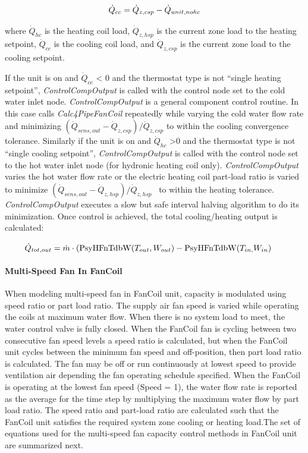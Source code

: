\begin{equation}
{\dot Q_{cc}} = {\dot Q_{z,csp}} - {\dot Q_{unit,no{\rm{ }}hc}}
\end{equation}

where \({\dot Q_{hc}}\) is the heating coil load, \({\dot Q_{z,hsp}}\) is the current zone load to the heating setpoint, \({\dot Q_{cc}}\) is the cooling coil load, and \({\dot Q_{z,csp}}\) is the current zone load to the cooling setpoint.

If the unit is on and \({\dot Q_{cc}}\) \textless{} 0 and the thermostat type is not ``single heating setpoint'', \emph{ControlCompOutput} is called with the control node set to the cold water inlet node. \emph{ControlCompOutput} is a general component control routine. In this case calls \emph{Calc4PipeFanCoil} repeatedly while varying the cold water flow rate and minimizing \(({\dot Q_{sens,out}} - {\dot Q_{z,csp}})/{\dot Q_{z,csp}}\) to within the cooling convergence tolerance. Similarly if the unit is on and \({\dot Q_{hc}}\) \textgreater{}0 and the thermostat type is not ``single cooling setpoint'', \emph{ControlCompOutput} is called with the control node set to the hot water inlet node (for hydronic heating coil only). \emph{ControlCompOutput} varies the hot water flow rate or the electric heating coil part-load ratio is varied to minimize \(({\dot Q_{sens,out}} - {\dot Q_{z,hsp}})/{\dot Q_{z,hsp}}\) ~to within the heating tolerance. \emph{ControlCompOutput} executes a slow but safe interval halving algorithm to do its minimization. Once control is achieved, the total cooling/heating output is calculated:

~~~~ \({\dot Q_{tot,out}} = \dot m\cdot ({\mathop{\rm PsyHFnTdbW}\nolimits} ({T_{out}},{W_{out}}) - {\mathop{\rm PsyHFnTdbW}\nolimits} ({T_{in,}}{W_{in}})\)

\paragraph{Multi-Speed Fan In FanCoil}\label{multi-speed-fan-in-fancoil}

When modeling multi-speed fan in FanCoil unit, capacity is modulated using speed ratio or part load ratio. The supply air fan speed is varied while operating the coils at maximum water flow. When there is no system load to meet, the water control valve is fully closed. When the FanCoil fan is cycling between two consecutive fan speed levels a speed ratio is calculated, but when the FanCoil unit cycles between the minimum fan speed and off-position, then part load ratio is calculated. The fan may be off or run continuously at lowest speed to provide ventilation air depending the fan operating schedule specified. When the FanCoil is operating at the lowest fan speed (Speed = 1), the water flow rate is reported as the average for the time step by multiplying the maximum water flow by part load ratio. The speed ratio and part-load ratio are calculated such that the FanCoil unit satisfies the required system zone cooling or heating load.The set of equations used for the multi-speed fan capacity control methods in FanCoil unit are summarized next.

